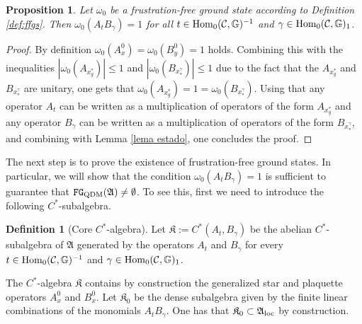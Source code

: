 \documentclass[a4paper,12pt,twoside,reqno]{amsart}
\theoremstyle{plain}
\newtheorem{prop}[teo]{Proposition}
\theoremstyle{definition}
\newtheorem{definition}[teo]{Definition}
\theoremstyle{remark}
\numberwithin{equation}{section}
\numberwithin{figure}{section}
\numberwithin{table}{section}
\newcommand{\f}[1]{\mathcal{#1}}
\newcommand{\n}[1]{\mathbb{#1}}
\begin{document}
	\begin{prop}\label{prop:frist_cond}
		Let $\omega_0$ be a frustration-free ground state according to Definition \ref{def:ffgs}. Then $\omega_0(A_tB_\gamma)=1$ for all $t\in {\rm Hom}_0(\f{C},\n{G})^{-1}$ and $\gamma\in {\rm Hom}_0(\f{C},\n{G})_1$.
	\end{prop}
	\begin{proof}
		By definition $\omega_0(A_x^0)=\omega_0(B_y^0)=1$ holds. Combining this with the inequalities  $|\omega_0(A_{x_g^*})|\leqslant1$ and $|\omega_0(B_{x_*^\gamma})|\leqslant1$ due to the fact that the $A_{x_g^*}$ and $B_{x_*^\gamma}$
		are unitary,
		one gets that $\omega_0(A_{x_g^*})=1=\omega_0(B_{x_*^\gamma})$. Using that any operator $A_t$ can be written as a multiplication of operators of the form $A_{x_g^*}$ and any operator $B_\gamma$  can be written as a multiplication of operators of the form $B_{x_*^\gamma}$, and combining with  Lemma \ref{lema estado}, one concludes the proof.
	\end{proof}
	
	
	\medskip
	
	
	
	
	
	
	The next step is to prove the existence of frustration-free ground states. In particular, we will
	show that the condition  $\omega_0(A_tB_\gamma)=1$
	is sufficient to guarantee that  $\mathtt{FG}_{\rm QDM}(\mathfrak{A})\neq\emptyset$. To see this, first we need to introduce the following $C^*$-subalgebra.
	
	
	
	
	
	\begin{definition}[Core $C^*$-algebra]\label{def:K}
		Let $\mathfrak{K}:=C^*(A_t,B_\gamma)$ be the abelian $C^*$-subalgebra of $\mathfrak{A}$ generated by the operators $A_t$ and $B_\gamma$ for every $t\in {\rm Hom}_0(\f{C},\n{G})^{-1}$ and $\gamma\in {\rm Hom}_0(\f{C},\n{G})_1$.
	\end{definition}
	
	
	
	\medskip
	
	
	
	
	
	
	The $C^*$-algebra $\mathfrak{K}$ contains by construction the generalized star and plaquette operators $A_x^0$ and $B_x^0$.
	Let $\mathfrak{K}_0$ be the dense subalgebra given by the finite linear combinations of the monomials $A_tB_\gamma$. One has that 
	$\mathfrak{K}_0\subset \mathfrak{A}_{\rm loc}$ by construction. 
	
\end{document}
